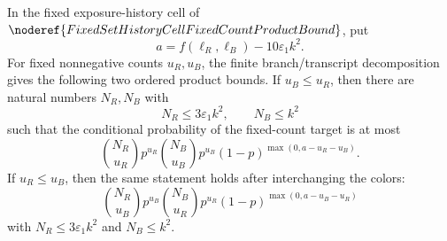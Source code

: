 \begin{helper}
In the fixed exposure-history cell of
\(\noderef{FixedSetHistoryCellFixedCountProductBound}\), put
\[
a=f(\ell_R,\ell_B)-10\varepsilon_1 k^2 .
\]
For fixed nonnegative counts \(u_R,u_B\), the finite branch/transcript
decomposition gives the following two ordered product bounds.  If
\(u_B\le u_R\), then there are natural numbers \(N_R,N_B\) with
\[
N_R\le 3\varepsilon_1 k^2,\qquad N_B\le k^2
\]
such that the conditional probability of the fixed-count target is at most
\[
\binom{N_R}{u_R}p^{u_R}\binom{N_B}{u_B}p^{u_B}
(1-p)^{\max(0,a-u_R-u_B)}.
\]
If \(u_R\le u_B\), then the same statement holds after interchanging the
colors:
\[
\binom{N_R}{u_B}p^{u_B}\binom{N_B}{u_R}p^{u_R}
(1-p)^{\max(0,a-u_B-u_R)}
\]
with \(N_R\le3\varepsilon_1 k^2\) and \(N_B\le k^2\).
\end{helper}
